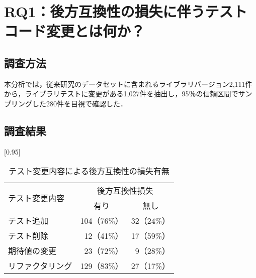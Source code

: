 \documentclass[twocolumn]{jarticle} %
\begin{document}
\section{RQ1：後方互換性の損失に伴うテストコード変更とは何か？}\label{rq1}

\subsection{調査方法}\label{rq1.chousahouhou}
本分析では，従来研究\cite{matsuda}のデータセットに含まれるライブラリバージョン2,111件から，ライブラリテストに変更がある1,027件を抽出し，95％の信頼区間でサンプリングした280件を目視で確認した．

\subsection{調査結果}

\begin{table}[t]
\centering
\caption{テスト変更内容による後方互換性の損失有無}\label{fig:test_pattern}
\scalebox{0.95}[0.95]{
\begin{tabular}{l|r|r}
\hline
\multirow{2}{*}{テスト変更内容} & \multicolumn{2}{c}{後方互換性損失}  \\ \cline{2-3}
 & \multicolumn{1}{c|}{有り} & \multicolumn{1}{c}{無し} \\ \hline
テスト追加 & 104（76\%） & 32（24\%） \\ \hline
テスト削除 & 12（41\%） & 17（59\%） \\ \hline
期待値の変更 & 23（72\%） & 9（28\%） \\ \hline
リファクタリング & 129（83\%） & 27（17\%） \\ \hline
\end{tabular}
}
\end{table}
\end{document}
